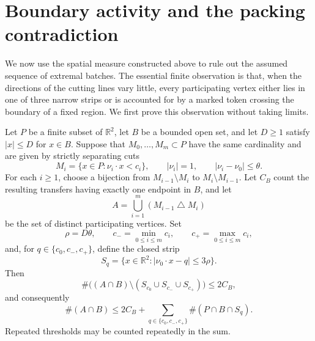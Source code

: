 \section{Boundary activity and the packing contradiction}
\label{sec:boundary}

We now use the spatial measure constructed above to rule out the assumed
sequence of extremal batches. The essential finite observation is that,
when the directions of the cutting lines vary little, every participating
vertex either lies in one of three narrow strips or is accounted for by
a marked token crossing the boundary of a fixed region. We first prove
this observation without taking limits.

\begin{lemma}
\label{lem:three-strips}
Let $P$ be a finite subset of $\mathbb R^2$, let $B$ be a bounded open set,
and let $D\geq1$ satisfy $|x|\leq D$ for $x\in B$. Suppose that
$M_0,\ldots,M_m\subset P$ have the same cardinality and are given by
strictly separating cuts
\[
 M_i=\{x\in P:\nu_i\cdot x<c_i\},
 \qquad |\nu_i|=1,
 \qquad |\nu_i-\nu_0|\leq\theta.
\]
For each $i\geq1$, choose a bijection from $M_{i-1}\setminus M_i$ to
$M_i\setminus M_{i-1}$. Let $C_B$ count the resulting transfers having
exactly one endpoint in $B$, and let
\[
 A=\bigcup_{i=1}^m(M_{i-1}\mathbin\triangle M_i)
\]
be the set of distinct participating vertices. Set
\[
 \rho=D\theta,\qquad c_- =\min_{0\leq i\leq m}c_i,
 \qquad c_+=\max_{0\leq i\leq m}c_i,
\]
and, for $q\in\{c_0,c_-,c_+\}$, define the closed strip
\[
 S_q=\{x\in\mathbb R^2:|\nu_0\cdot x-q|\leq3\rho\}.
\]
Then
\[
 \#\bigl((A\cap B)\setminus(S_{c_0}\cup S_{c_-}\cup S_{c_+})\bigr)
 \leq2C_B,
\]
and consequently
\begin{equation}
 \#(A\cap B)
 \leq 2C_B+
 \sum_{q\in\{c_0,c_-,c_+\}}\#(P\cap B\cap S_q).
 \label{eq:finite-three-strips}
\end{equation}
Repeated thresholds may be counted repeatedly in the sum.
\end{lemma}

